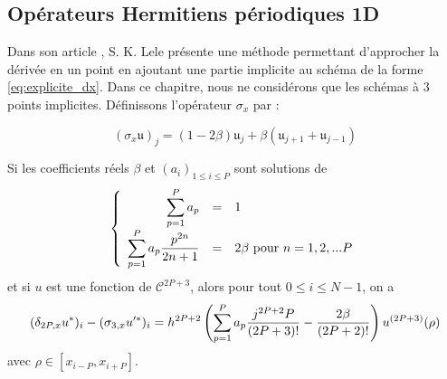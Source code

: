 \subsection{Opérateurs Hermitiens périodiques 1D}

Dans son article \cite{Lele1991}, S. K. Lele présente une méthode permettant d'approcher la dérivée en un point en ajoutant une partie implicite au schéma de la forme \eqref{eq:explicite_dx}. Dans ce chapitre, nous ne considérons que les schémas à 3 points implicites. Définissons l'opérateur $\sigma_{x}$ par :

\begin{equation}
(\sigma_{x} \mathfrak{u})_j = (1-2\beta) \mathfrak{u}_j + \beta \left( \mathfrak{u}_{j+1} + \mathfrak{u}_{j-1} \right)
\end{equation}

\begin{theoreme}
Si les coefficients réels $\beta$ et $(a_i)_{1 \leq i \leq P}$ sont solutions de 
\begin{equation}
\left\lbrace
\begin{array}{rcl}
\displaystyle\sum\limits_{p=1}^P a_p & = & 1 \\
\displaystyle\sum\limits_{p=1}^P a_p \dfrac{p^{2n}}{2n+1} & = & 2 \beta  \text{ pour } n=1,2,...P
\end{array}
\right.
\label{eq:hermitian_system}
\end{equation}
et si $u$ est une fonction de $\mathcal{C}^{2P+3}$, alors pour tout $0 \leq i \leq N-1$, on a 
\begin{equation}
(\delta_{2P,x} u^*)_i - (\sigma_{3,x} u'^*)_i = \\
h^{2P+2} \left( \displaystyle\sum\limits_{p=1}^P a_p  \dfrac{j^{2P+2} P}{(2P+3)!}  - \dfrac{2\beta}{(2P+2)!}   \right)u^{(2P+3)}(\rho)
\label{eq:eq_cons}
\end{equation}
avec $\rho \in [x_{i-P}, x_{i+P}]$.
\end{theoreme}

